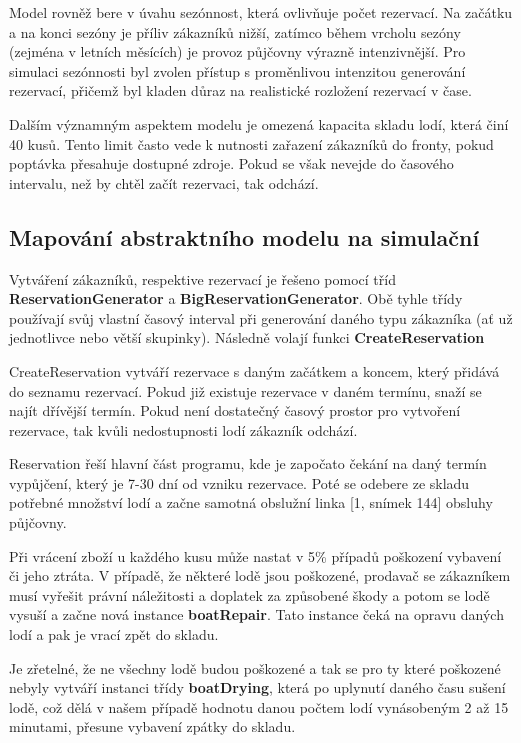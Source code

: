 \documentclass[a4paper, 12pt, hidelinks]{article}
\begin{document}
Model rovněž bere v úvahu sezónnost, která ovlivňuje počet rezervací. Na začátku a na konci sezóny je příliv zákazníků nižší, zatímco během vrcholu sezóny (zejména v letních měsících) je provoz půjčovny výrazně intenzivnější. Pro simulaci sezónnosti byl zvolen přístup s proměnlivou intenzitou generování rezervací, přičemž byl kladen důraz na realistické rozložení rezervací v čase.

Dalším významným aspektem modelu je omezená kapacita skladu lodí, která činí 40 kusů. Tento limit často vede k nutnosti zařazení zákazníků do fronty, pokud poptávka přesahuje dostupné zdroje. Pokud se však nevejde do časového intervalu, než by chtěl začít rezervaci, tak odchází.

\subsection{Mapování abstraktního modelu na simulační}
Vytváření zákazníků, respektive rezervací je řešeno pomocí tříd \textbf{ReservationGenerator} a \textbf{BigReservationGenerator}. Obě tyhle třídy používají svůj vlastní časový interval při generování daného typu zákazníka (ať už jednotlivce nebo větší skupinky). Následně volají funkci \textbf{CreateReservation}

CreateReservation vytváří rezervace s daným začátkem a koncem, který přidává do seznamu rezervací. Pokud již existuje rezervace v daném termínu, snaží se najít dřívější termín. Pokud není dostatečný časový prostor pro vytvoření rezervace, tak kvůli nedostupnosti lodí zákazník odchází.

Reservation řeší hlavní část programu, kde je započato čekání na daný termín vypůjčení, který je 7-30 dní od vzniku rezervace. Poté se odebere ze skladu potřebné množství lodí a začne samotná obslužní linka [1, snímek 144] obsluhy půjčovny.

Při vrácení zboží u každého kusu může nastat v 5\% případů poškození vybavení či jeho ztráta. V případě, že některé lodě jsou poškozené, prodavač se zákazníkem musí vyřešit právní náležitosti a doplatek za způsobené škody a potom se lodě vysuší a začne nová instance \textbf{boatRepair}. Tato instance čeká na opravu daných lodí a pak je vrací zpět do skladu.

Je zřetelné, že ne všechny lodě budou poškozené a tak se pro ty které poškozené nebyly vytváří instanci třídy \textbf{boatDrying}, která po uplynutí daného času sušení lodě, což dělá v našem případě hodnotu danou počtem lodí vynásobeným 2 až 15 minutami, přesune vybavení zpátky do skladu.
\end{document}
